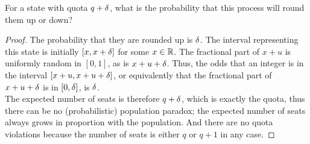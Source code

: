 \documentclass{amsart}
\begin{document}
	For a state with quota $q+\delta$, what is the probability that this process will round them up or down?
	\begin{proof}
		The probability that they are rounded up is $\delta$. The interval representing this state is initially $[x,x+\delta]$ for some $x\in \mathbb{R}$. The fractional part of $x+u$ is uniformly random in $[0,1]$, as is $x+u+\delta$. Thus, the odds that an integer is in the interval $[x+u,x+u+\delta]$, or equivalently that the fractional part of $x+u+\delta$ is in $[0,\delta]$, is $\delta$.\\
		
		The expected number of seats is therefore $q+\delta$, which is exactly the quota, thus there can be no (probabilistic) population paradox; the expected number of seats always grows in proportion with the population. And there are no quota violations because the number of seats is either $q$ or $q+1$ in any case.
	\end{proof}
	
	\newpage 
	
\end{document}
